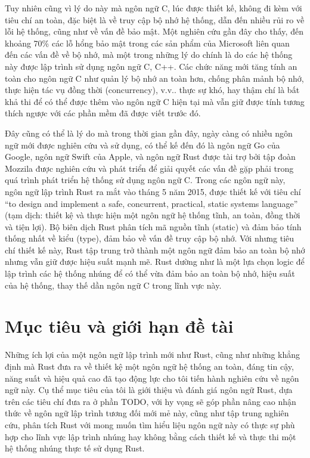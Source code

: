 Tuy nhiên cũng vì lý do này mà ngôn ngữ C, lúc được thiết kế, không đi kèm với tiêu chí an toàn, đặc biệt là về truy cập bộ nhớ hệ thống, dẫn đến nhiều rủi ro về lỗi hệ thống, cũng như về vấn đề bảo mật. Một nghiên cứu gần đây cho thấy, đến khoảng 70\% các lỗ hổng bảo mật trong các sản phẩm của Microsoft liên quan đến các vấn đề về bộ nhớ, mà một trong những lý do chính là do các hệ thống này được lập trình sử dụng ngôn ngữ C, C++.
Các chức năng mới tăng tính an toàn cho ngôn ngữ C như quản lý bộ nhớ an toàn hơn, chống phân mảnh bộ nhớ, thực hiện tác vụ đồng thời (concurrency), v.v.. thực sự khó, hay thậm chí là bất khả thi để có thể được thêm vào ngôn ngữ C hiện tại mà vẫn giữ được tính tương thích ngược với các phần mềm đã được viết trước đó.

Đây cũng có thể là lý do mà trong thời gian gần đây, ngày càng có nhiều ngôn ngữ mới được nghiên cứu và sử dụng, có thể kế đến đó là ngôn ngữ Go của Google, ngôn ngữ Swift của Apple, và ngôn ngữ Rust được tài trợ bởi tập đoàn Mozzila được nghiên cứu và phát triển để giải quyết các vấn đề gặp phải trong quá trình phát triển hệ thống sử dụng ngôn ngữ C. Trong các ngôn ngữ này, ngôn ngữ lập trình Rust ra mắt vào tháng 5 năm 2015, được thiết kế với tiêu chí ``to design and implement a safe, concurrent, practical, static systems language'' (tạm dịch: thiết kệ và thực hiện một ngôn ngữ hệ thống tĩnh, an toàn, đồng thời và tiện lợi). Bộ biên dịch Rust phân tích mã nguồn tĩnh (static) và đảm bảo tính thống nhất về kiểu (type), đảm bảo về vấn đề truy cập bộ nhớ. Với nhưng tiêu chí thiết kế này, Rust tập trung trở thành một ngôn ngữ đảm bảo an toàn bộ nhớ nhưng vẫn giữ được hiệu suất mạnh mẽ. Rust dường như là một lựa chọn logic để lập trình các hệ thống nhúng để có thể vừa đảm bảo an toàn bộ nhớ, hiệu suất của hệ thống, thay thế dần ngôn ngữ C trong lĩnh vực này.

\section{Mục tiêu và giới hạn đề tài}
Những ích lợi của một ngôn ngữ lập trình mới như Rust, cũng như những khẳng định mà Rust đưa ra về thiết kệ một ngôn ngữ hệ thống an toàn, đáng tin cậy, năng suất và hiệu quả cao đã tạo động lực cho tôi tiến hành nghiên cứu về ngôn ngữ này. Cụ thể mục tiêu của tôi là giới thiệu và đánh giá ngôn ngữ Rust, dựa trên các tiêu chí đưa ra ở phần TODO, với hy vọng sẽ góp phần nâng cao nhận thức về ngôn ngữ lập trình tương đối mới mẻ này, cũng như tập trung nghiên cứu, phân tích Rust với mong muốn tìm hiểu liệu ngôn ngữ này có thực sự phù hợp cho lĩnh vực lập trình nhúng hay không bằng cách thiết kế và thực thi một hệ thống nhúng thực tế sử dụng Rust.

